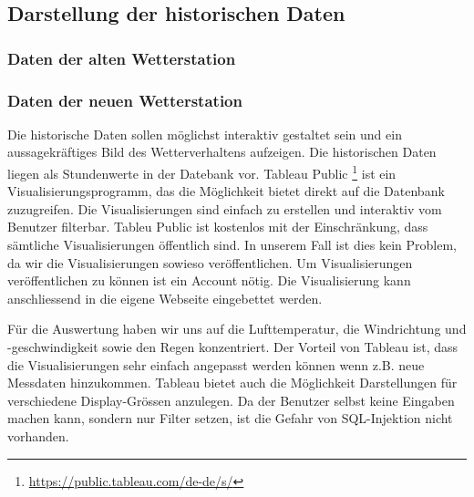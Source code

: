 \subsection{Darstellung der historischen Daten}

\subsubsection{Daten der alten Wetterstation}
\newline
{}\newline
{}\newline

\subsubsection{Daten der neuen Wetterstation}
\newline
{}\newline

Die historische Daten sollen möglichst interaktiv gestaltet sein und ein aussagekräftiges Bild des Wetterverhaltens aufzeigen. Die historischen Daten liegen als Stundenwerte in der Datebank vor.
Tableau Public \footnote{ \url{https://public.tableau.com/de-de/s/}} ist ein Visualisierungsprogramm, das die Möglichkeit bietet direkt auf die Datenbank zuzugreifen. Die Visualisierungen sind einfach zu erstellen und interaktiv vom Benutzer filterbar.
Tableu Public ist kostenlos mit der Einschränkung, dass sämtliche Visualisierungen öffentlich sind. In unserem Fall ist dies kein Problem, da wir die Visualisierungen sowieso veröffentlichen. Um Visualisierungen veröffentlichen zu können ist ein Account nötig. Die Visualisierung kann anschliessend in die eigene Webseite eingebettet werden.

Für die Auswertung haben wir uns auf die Lufttemperatur, die Windrichtung und -geschwindigkeit sowie den Regen konzentriert.
Der Vorteil von Tableau ist, dass die Visualisierungen sehr einfach angepasst werden können wenn z.B. neue Messdaten hinzukommen. Tableau bietet auch die Möglichkeit Darstellungen für verschiedene Display-Grössen anzulegen. Da der Benutzer selbst keine Eingaben machen kann, sondern nur Filter setzen, ist die Gefahr von SQL-Injektion nicht vorhanden.


